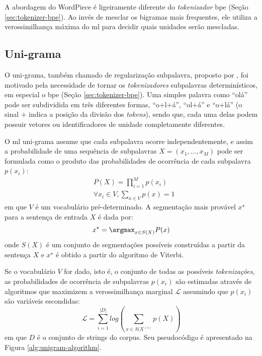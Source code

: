 A abordagem do WordPiece é ligeiramente diferente do \textit{tokenizador} \gls{bpe} (Seção \ref{sec:tokenizer-bpe}). Ao invés de mesclar os bigramas mais frequentes, ele utiliza a verossimilhança máxima do \gls{ml} para decidir quais unidades serão mescladas.

\subsection{ Uni-grama}
\label{sec:tokenizer-unigram}

O  uni-grama, também chamado de regularização subpalavra, proposto por \textcite{Kudo2018Subword}, foi motivado pela necessidade de tornar os \textit{tokenizadores} subpalavras determinísticos, em especial o \gls{bpe} (Seção \ref{sec:tokenizer-bpe}). Uma simples palavra como \enquote{olá} pode ser subdividida em três diferentes formas, \enquote{o+l+á}, \enquote{ol+á} e \enquote{o+lá} (o sinal $+$ indica a posição da divisão dos \textit{tokens}), sendo que, cada uma delas podem possuir vetores ou identificadores de unidade completamente diferentes.

O \gls{ml} uni-grama assume que cada subpalavra ocorre independentemente, e assim a probabilidade de uma sequência de subpalavras $X = (x_1, \dots, x_M)$ pode ser formulada como o produto das probabilidades de ocorrência de cada subpalavra $p(x_i)$:
\begin{equation}
\begin{aligned}
    \label{eq:unigram-model}
    & P(X) = \prod_{i=1}^{M} p(x_i)\\
    & \forall x_i \in V, \sum_{x \in V}p(x) = 1
\end{aligned}
\end{equation}
em que $V$ é um vocabulário pré-determinado. A segmentação mais provável $x^\star$ para a sentença de entrada $X$ é dada por:
\begin{equation}
    \label{eq:unigram-model-most-probable}
    x^\star = \argmax_{x \in S(X)} P(x)
\end{equation}
onde $S(X)$ é um conjunto de segmentações possíveis construídas a partir da sentença $X$ e $x^\star$ é obtido a partir do algoritmo de Viterbi.

Se o vocabulário $V$ for dado, isto é, o conjunto de todas as possíveis \textit{tokenizações}, as probabilidades de ocorrência de subpalavras $p(x_i)$ são estimadas através de algoritmos que maximizem a verossimilhança marginal $\mathcal{L}$ assumindo que $p(x_i)$ são variáveis escondidas:
\begin{equation}
    \label{eq:unigram-model-likelihood}
    \mathcal{L} = \sum_{i=1}^{|D|} log ( \sum_{x \in S(X^{(s)}} p(X))
\end{equation}
em que $D$ é o conjunto de strings do corpus. Seu pseudocódigo é apresentado na Figura \ref{alg:unigram-algorithm}.

